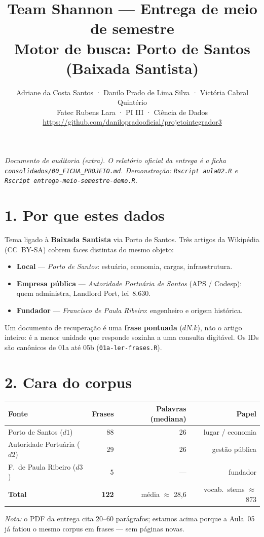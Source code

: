 \documentclass[11pt,a4paper]{article}
\title{\vspace{-1.2cm}\textbf{Team Shannon} --- Entrega de meio de semestre\\
\large Motor de busca: Porto de Santos (Baixada Santista)}
\author{Adriane da Costa Santos · Danilo Prado de Lima Silva · Victória Cabral Quintério\\
\small Fatec Rubens Lara · PI III · Ciência de Dados\\
\url{https://github.com/danilopradooficial/projetointegrador3}}
\date{}
\begin{document}
\maketitle
\vspace{-1.2cm}

\noindent\textit{Documento de auditoria (extra). O relatório oficial da entrega é a ficha
\texttt{consolidados/00\_FICHA\_PROJETO.md}. Demonstração: \texttt{Rscript aula02.R}
e \texttt{Rscript entrega-meio-semestre-demo.R}.}

\section*{1. Por que estes dados}
Tema ligado à \textbf{Baixada Santista} via Porto de Santos. Três artigos da Wikipédia
(CC~BY-SA) cobrem faces distintas do mesmo objeto:

\begin{itemize}
  \setlength\itemsep{0.1em}
  \item \textbf{Local} --- \emph{Porto de Santos}: estuário, economia, cargas, infraestrutura.
  \item \textbf{Empresa pública} --- \emph{Autoridade Portuária de Santos} (APS / Codesp):
        quem administra, Landlord Port, lei~8.630.
  \item \textbf{Fundador} --- \emph{Francisco de Paula Ribeiro}: engenheiro e origem histórica.
\end{itemize}

Um documento de recuperação é uma \textbf{frase pontuada} ($dN.k$), não o artigo inteiro:
é a menor unidade que responde sozinha a uma consulta digitável. Os IDs são canônicos de
01a até 05b (\texttt{01a-ler-frases.R}).

\section*{2. Cara do corpus}
\begin{center}
\begin{tabular}{@{}lrrr@{}}
\toprule
Fonte & Frases & Palavras (mediana) & Papel \\
\midrule
Porto de Santos ($d1$) & 88 & 26 & lugar / economia \\
Autoridade Portuária ($d2$) & 29 & 26 & gestão pública \\
F.\ de Paula Ribeiro ($d3$) & 5 & --- & fundador \\
\midrule
\textbf{Total} & \textbf{122} & média $\approx$ 28,6 & vocab.\ stems $\approx$ 873 \\
\bottomrule
\end{tabular}
\end{center}
\noindent\textit{Nota:} o PDF da entrega cita 20--60 parágrafos; estamos acima porque a Aula~05
já fatiou o mesmo corpus em frases --- sem páginas novas.
\end{document}
